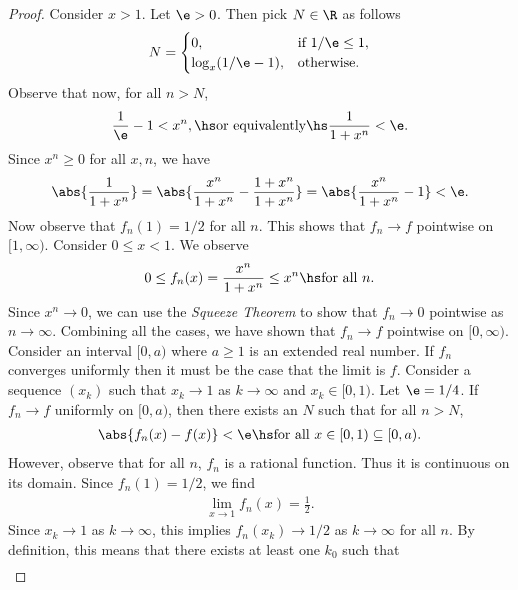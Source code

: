 \documentclass{article}
\begin{document}
\begin{proof}
   Consider $x>1$. Let $\e>0$. Then pick $N\in\R$ as follows
   \begin{align*}
      N = \begin{cases}
         0, &\text{if }1/\e \leq 1,\\
         \log_x(1/\e-1), &\text{otherwise.}
      \end{cases} 
   \end{align*} 
   Observe that now, for all $n>N$, 
   \begin{align*}
      \frac{1}{\e} - 1 < x^n,
      \hs\text{or equivalently}\hs
      \frac{1}{1+x^n}< \e.
   \end{align*}
   Since $x^n\geq 0$ for all $x,n$, we have
   \begin{align*}
      \abs{\frac{1}{1+x^n}}=\abs{\frac{x^n}{1+x^n}-\frac{1+x^n}{1+x^n}}
      =\abs{\frac{x^n}{1+x^n}-1}<\e.
   \end{align*}
   Now observe that $f_n(1)=1/2$ for all $n$.
   This shows that $f_n\to f$ pointwise on $[1,\infty)$. Consider $0\leq x<1$.
   We observe
   \begin{align*}
      0 \leq f_n(x)=\frac{x^n}{1 + x^n} \leq x^n\hs\text{for all }n.
   \end{align*}
   Since $x^n\to 0$, we can use the \emph{Squeeze Theorem} to show that
   $f_n\to 0$ pointwise as $n\to\infty$. Combining all the cases, we have shown that
   $f_n\to f$ pointwise on $[0, \infty)$. Consider an interval $[0,a)$ where $a\geq 1$
   is an extended real number. If $f_n$ converges uniformly then it must be the
   case that the limit is $f$. Consider a sequence $(x_k)$ such that $x_k\to 1$ as
   $k\to\infty$ and $x_k\in[0,1)$. Let $\e=1/4$. If $f_n\to f$ uniformly on $[0, a)$, then 
   there exists an $N$ such that for all $n>N$,
   \begin{align}
      \label{cond1}
      \abs{f_n(x)-f(x)} < \e \hs\text{for all }x\in [0, 1) \subseteq [0, a).
   \end{align}
   However, observe that for all $n$, $f_n$ is a rational function. Thus it is
   continuous on its domain. Since $f_n(1)=1/2$, we find 
   \begin{align*}
      \lim_{x\to 1} f_n(x) = \frac{1}{2}.
   \end{align*}
   Since $x_k\to 1$ as $k\to\infty$, this implies $f_n(x_k)\to 1/2$ as $k\to\infty$ for all $n$.
   By definition, this means that there exists at least one $k_0$ such that
   \begin{align}
      \label{cond2}

\end{align}
\end{proof}
\end{document}
